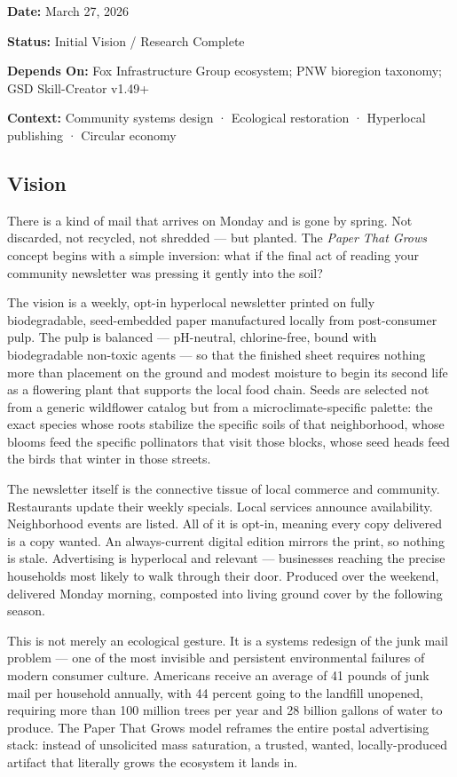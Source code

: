 \documentclass[11pt,letterpaper]{article}
\newcommand{\metafield}[2]{\textbf{\sffamily #1} #2\par}
\begin{document}
\metafield{Date:}{March 27, 2026}
\metafield{Status:}{Initial Vision / Research Complete}
\metafield{Depends On:}{Fox Infrastructure Group ecosystem; PNW bioregion taxonomy; GSD Skill-Creator v1.49+}
\metafield{Context:}{Community systems design · Ecological restoration · Hyperlocal publishing · Circular economy}

\subsection{Vision}

There is a kind of mail that arrives on Monday and is gone by spring. Not discarded, not recycled, not shredded --- but planted. The \textit{Paper That Grows} concept begins with a simple inversion: what if the final act of reading your community newsletter was pressing it gently into the soil?

The vision is a weekly, opt-in hyperlocal newsletter printed on fully biodegradable, seed-embedded paper manufactured locally from post-consumer pulp. The pulp is balanced --- pH-neutral, chlorine-free, bound with biodegradable non-toxic agents --- so that the finished sheet requires nothing more than placement on the ground and modest moisture to begin its second life as a flowering plant that supports the local food chain. Seeds are selected not from a generic wildflower catalog but from a microclimate-specific palette: the exact species whose roots stabilize the specific soils of that neighborhood, whose blooms feed the specific pollinators that visit those blocks, whose seed heads feed the birds that winter in those streets.

The newsletter itself is the connective tissue of local commerce and community. Restaurants update their weekly specials. Local services announce availability. Neighborhood events are listed. All of it is opt-in, meaning every copy delivered is a copy wanted. An always-current digital edition mirrors the print, so nothing is stale. Advertising is hyperlocal and relevant --- businesses reaching the precise households most likely to walk through their door. Produced over the weekend, delivered Monday morning, composted into living ground cover by the following season.

This is not merely an ecological gesture. It is a systems redesign of the junk mail problem --- one of the most invisible and persistent environmental failures of modern consumer culture. Americans receive an average of 41 pounds of junk mail per household annually, with 44 percent going to the landfill unopened, requiring more than 100 million trees per year and 28 billion gallons of water to produce. The Paper That Grows model reframes the entire postal advertising stack: instead of unsolicited mass saturation, a trusted, wanted, locally-produced artifact that literally grows the ecosystem it lands in.
\end{document}
